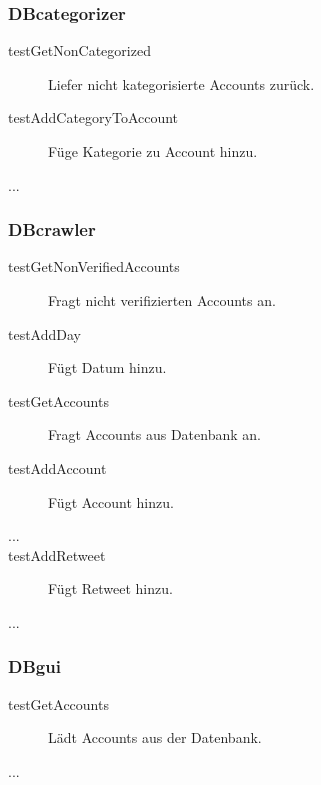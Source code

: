 \subsubsection{DBcategorizer}
\quad
\begin{description}
	\item[testGetNonCategorized] Liefer nicht kategorisierte Accounts zurück.
	\item[testAddCategoryToAccount] Füge Kategorie zu Account hinzu.
	\item[...]
\end{description}
\subsubsection{DBcrawler}
\begin{description}
	\item[testGetNonVerifiedAccounts] Fragt nicht verifizierten Accounts an.
	\item[testAddDay] Fügt Datum hinzu.
	\item[testGetAccounts] Fragt Accounts aus Datenbank an.
	\item[testAddAccount] Fügt Account hinzu.
	\item[...]
	\item[testAddRetweet] Fügt Retweet hinzu.
	\item[...]	
\end{description}
\subsubsection{DBgui}
\begin{description}
	\item [testGetAccounts] Lädt Accounts aus der Datenbank.
	\item [...]
\end{description}
\quad




